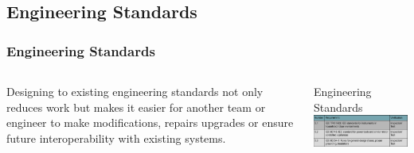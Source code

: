 \documentclass[aspectratio=169]{beamer}
\begin{document}
\subsection{Engineering Standards}
\begin{frame}
    \frametitle{Engineering Standards}

    \begin{columns}
        \begin{column}{0.48\textwidth}
            Designing to existing engineering standards not only reduces work but makes it easier
            for another team or engineer to make modifications, repairs upgrades or ensure future
            interoperability with existing systems.
        \end{column}

        \begin{column}{0.48\textwidth}
            \begin{block}{Engineering Standards}
                \includegraphics[width=7.3cm]{EngineeringStandards}
            \end{block}
        \end{column}
    \end{columns}


\end{frame}
\end{document}
